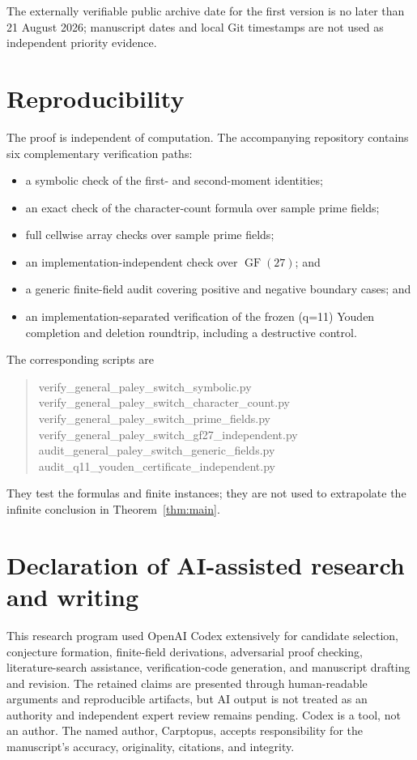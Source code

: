 \documentclass[11pt]{article}
\theoremstyle{definition}
\theoremstyle{remark}
\DeclareMathOperator{\GF}{GF}
\begin{document}
The externally verifiable public archive date for the first version is no
later than 21 August 2026; manuscript dates and local Git timestamps are not
used as independent priority evidence.

\section{Reproducibility}
The proof is independent of computation.  The accompanying repository
contains six complementary verification paths:
\begin{itemize}
\item a symbolic check of the first- and second-moment identities;
\item an exact check of the character-count formula over sample prime fields;
\item full cellwise array checks over sample prime fields;
\item an implementation-independent check over \(\GF(27)\); and
\item a generic finite-field audit covering positive and negative boundary
      cases; and
\item an implementation-separated verification of the frozen (q=11)
      Youden completion and deletion roundtrip, including a destructive control.
\end{itemize}
The corresponding scripts are
\begin{quote}
\ttfamily\small
verify\_general\_paley\_switch\_symbolic.py\\
verify\_general\_paley\_switch\_character\_count.py\\
verify\_general\_paley\_switch\_prime\_fields.py\\
verify\_general\_paley\_switch\_gf27\_independent.py\\
audit\_general\_paley\_switch\_generic\_fields.py\\
audit\_q11\_youden\_certificate\_independent.py
\end{quote}
\medskip
They test the formulas and finite instances; they are not used to extrapolate
the infinite conclusion in Theorem~\ref{thm:main}.

\section*{Declaration of AI-assisted research and writing}
This research program used OpenAI Codex extensively for candidate selection,
conjecture formation, finite-field derivations, adversarial proof checking,
literature-search assistance, verification-code generation, and manuscript
drafting and revision.  The retained claims are presented through
human-readable arguments and reproducible artifacts, but AI output is not
treated as an authority and independent expert review remains pending.  Codex
is a tool, not an author.  The named author, Carptopus, accepts responsibility
for the manuscript's accuracy, originality, citations, and integrity.
\end{document}
